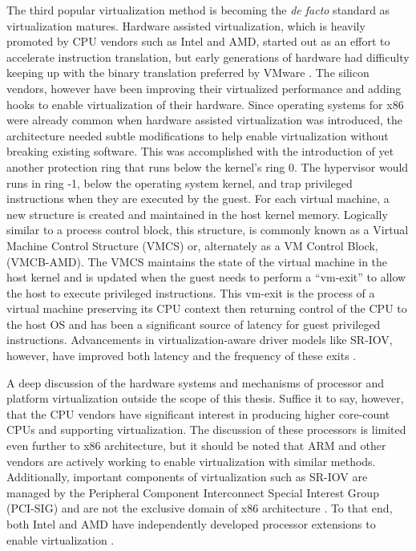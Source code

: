 The third popular virtualization method is becoming the \emph{de facto} standard as virtualization matures.
Hardware assisted virtualization, which is heavily promoted by CPU vendors such as Intel and AMD, started out as an effort to accelerate instruction translation, but early generations of hardware had difficulty keeping up with the binary translation preferred by VMware \autocite{vmwareVT}.
The silicon vendors, however have been improving their virtualized performance and adding hooks to enable virtualization of their hardware.
Since operating systems for x86 were already common when hardware assisted virtualization was introduced, the architecture needed subtle modifications to help enable virtualization without breaking existing software.  
This was accomplished with the introduction of yet another protection ring that runs below the kernel's ring 0.  
The hypervisor would runs in ring -1, below the operating system kernel, and trap privileged instructions when they are executed by the guest.
For each virtual machine, a new structure is created and maintained in the host kernel memory.  
Logically similar to a process control block, this structure, is commonly known as a Virtual Machine Control Structure (VMCS) or, alternately as a VM Control Block, (VMCB-AMD). 
The VMCS maintains the state of the virtual machine in the host kernel and is updated when the guest needs to perform a ``vm-exit'' to allow the host to execute privileged instructions.
This vm-exit is the process of a virtual machine preserving its CPU context then returning control of the CPU to the host OS and has been a significant source of latency for guest privileged instructions.
Advancements in virtualization-aware driver models like SR-IOV, however, have improved both latency and the frequency of these exits \autocite{_nasa_1}.

A deep discussion of the hardware systems and mechanisms of processor and platform virtualization outside the scope of this thesis.
Suffice it to say, however, that the CPU vendors have significant interest in producing higher core-count CPUs and supporting virtualization.
The discussion of these processors is limited even further to x86 architecture, but it should be noted that ARM and other vendors are actively working to enable virtualization with similar methods.
Additionally, important components of virtualization such as SR-IOV are managed by the Peripheral Component Interconnect Special Interest Group (PCI-SIG) and are not the exclusive domain of x86 architecture \autocite{_pcisig_1}.
To that end, both Intel and AMD have independently developed processor extensions to enable virtualization \autocite{_grinberg_1}.

